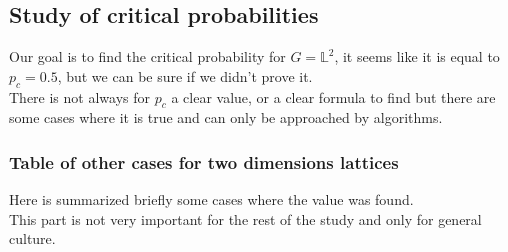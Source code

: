 \documentclass{article}
\begin{document}
\subsection{Study of critical probabilities}

Our goal is to find the critical probability for $G = \mathbb{L}^2$, it seems like it is equal to $p_c = 0.5$, but we can be sure if we didn't prove it. \\
There is not always for $p_c$ a clear value, or a clear formula to find but there are some cases where it is true and can only be approached by algorithms.

\subsubsection{Table of other cases for two dimensions lattices}
Here is summarized briefly some cases where the value was found. \\
This part is not very important for the rest of the study and only for general culture.
\end{document}
